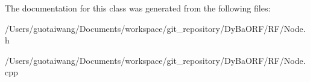 The documentation for this class was generated from the following files\+:\begin{DoxyCompactItemize}
\item 
/\+Users/guotaiwang/\+Documents/workspace/git\+\_\+repository/\+Dy\+Ba\+O\+R\+F/\+R\+F/Node.\+h\item 
/\+Users/guotaiwang/\+Documents/workspace/git\+\_\+repository/\+Dy\+Ba\+O\+R\+F/\+R\+F/Node.\+cpp\end{DoxyCompactItemize}
